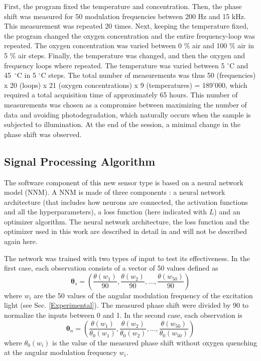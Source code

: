 \documentclass[sensors,article,submit,moreauthors,pdftex,10pt,a4paper]{Definitions/mdpi}
\begin{document}
First, the program fixed the temperature and concentration. Then, the phase shift was measured for 50 modulation frequencies between 200 Hz and 15 kHz. This measurement was repeated 20 times. Next, keeping the temperature fixed, the program changed the oxygen concentration and the entire frequency-loop was repeated.
The oxygen concentration was varied between 0 $\%$ air and 100 $\%$ air in 5 $\%$ air steps.
Finally, the temperature was changed, and then the oxygen and frequency loops where repeated. The temperature was varied between 5 $^\circ$C and 45~$^\circ$C in 5 $^\circ$C steps.
The total number of measurements was thus 50 (frequencies) x 20 (loops) x 21 (oxygen concentrations) x 9 (temperatures) = 189'000, which required a total acquisition time of approximately 65 hours. This number of measurements was chosen as a compromise between maximizing the number of data and avoiding photodegradation, which naturally occurs when the sample is subjected to illumination. At the end of the session, a minimal change in the phase shift was observed.


\subsection{Signal Processing Algorithm}
\label{NN}

The software component of this new sensor type is based on a neural network model (NNM). A NNM is made of three components \cite{Michelucci2017}: a neural network architecture (that includes how neurons are connected, the activation functions and all the hyperparameters), a loss function (here indicated with $L$) and an optimizer algorithm. 
The neural network architecture, the loss function and the optimizer used in this work are described in detail in \cite{Michelucci2019_2} and will not be described again here.

The network was trained with two types of input to test its effectiveness. In the first case, each observation consists of a vector of 50 values defined as
\begin{equation}
\label{input1}
{\pmb \theta}_s = \left(
\frac{\theta(w_1)}{90} , \frac{\theta(w_2)}{90} , ..., \frac{\theta(w_{50})}{90} 
\right)
\end{equation}
where $w_i$ are the 50 values of the angular modulation frequency of the excitation light (see Sec. \ref{Experimental}). The measured phase shift were divided by 90 to normalize the inputs between 0 and 1. In the second case, each observation is
\begin{equation}
\label{input2}
{\pmb \theta}_n = \left(
\frac{\theta(w_1)}{\theta_0(w_1)} , \frac{\theta(w_2)}{\theta_0(w_2)} , ..., \frac{\theta(w_{50})}{\theta_0(w_{50})} 
\right)
\end{equation}
where $\theta_0(w_i)$ is the value of the measured phase shift without oxygen quenching at the angular modulation frequency $w_i$.
\end{document}
